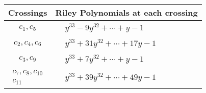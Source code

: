 \documentclass[1p]{elsarticle_modified}
\theoremstyle{definition}
\begin{document}
\begin{tabular}{m{50pt}|m{274pt}}
Crossings & \hspace{64pt}Riley Polynomials at each crossing \\
\hline $$\begin{aligned}c_{1},c_{5}\end{aligned}$$&$\begin{aligned}
&y^{33}-9 y^{32}+\cdots+y-1
\end{aligned}$\\
\hline $$\begin{aligned}c_{2},c_{4},c_{6}\end{aligned}$$&$\begin{aligned}
&y^{33}+31 y^{32}+\cdots+17 y-1
\end{aligned}$\\
\hline $$\begin{aligned}c_{3},c_{9}\end{aligned}$$&$\begin{aligned}
&y^{33}+7 y^{32}+\cdots+y-1
\end{aligned}$\\
\hline $$\begin{aligned}c_{7},c_{8},c_{10}\\c_{11}\end{aligned}$$&$\begin{aligned}
&y^{33}+39 y^{32}+\cdots+49 y-1
\end{aligned}$\\
\hline
\end{tabular}
\vskip 2pc
\end{document}

